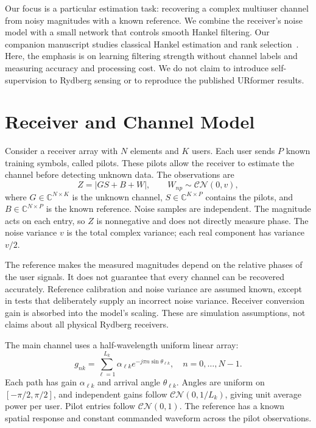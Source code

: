\documentclass[journal]{IEEEtran}
\newcommand{\CN}{\mathcal{CN}}
\begin{document}
Our focus is a particular estimation task: recovering a complex multiuser
channel from noisy magnitudes with a known reference. We combine the
receiver's noise model with a small network that controls smooth Hankel
filtering. Our companion manuscript studies classical Hankel estimation and
rank selection~\cite{haatimcompanion}. Here, the emphasis is on learning
filtering strength without channel labels and measuring accuracy and
processing cost. We do not claim to introduce self-supervision to Rydberg
sensing or to reproduce the published URformer results.

\section{Receiver and Channel Model}
Consider a receiver array with $N$ elements and $K$ users. Each user sends
$P$ known training symbols, called pilots. These pilots allow the receiver
to estimate the channel before detecting unknown data. The observations are
\begin{equation}
 Z=|GS+B+W|,\qquad W_{np}\sim\CN(0,v),
 \label{eq:model}
\end{equation}
where $G\in\mathbb C^{N\times K}$ is the unknown channel,
$S\in\mathbb C^{K\times P}$ contains the pilots, and
$B\in\mathbb C^{N\times P}$ is the known reference. Noise samples are
independent. The magnitude acts on each entry, so $Z$ is nonnegative and
does not directly measure phase. The noise variance $v$ is the total
complex variance; each real component has variance $v/2$.

The reference makes the measured magnitudes depend on the relative phases
of the user signals. It does not guarantee that every channel can be
recovered accurately. Reference calibration and noise variance are assumed
known, except in tests that deliberately supply an incorrect noise variance.
Receiver conversion gain is absorbed into the model's scaling. These are
simulation assumptions, not claims about all physical Rydberg receivers.

The main channel uses a half-wavelength uniform linear array:
\begin{equation}
 g_{nk}=\sum_{\ell=1}^{L_k}\alpha_{\ell k}
 e^{-j\pi n\sin\theta_{\ell k}},\quad n=0,\ldots,N-1.
 \label{eq:channel}
\end{equation}
Each path has gain $\alpha_{\ell k}$ and arrival angle $\theta_{\ell k}$.
Angles are uniform on $[-\pi/2,\pi/2]$, and independent gains follow
$\CN(0,1/L_k)$, giving unit average power per user. Pilot entries follow
$\CN(0,1)$. The reference has a known spatial response and constant
commanded waveform across the pilot observations.
\end{document}
